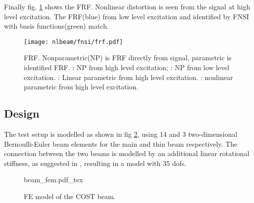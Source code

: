 Finally fig. \ref{fig:nlbeam_frf} shows the FRF. Nonlinear distortion is seen
from the signal at high level excitation. The FRF(blue) from low level excitation and
identified by FNSI with basis functions(green) match.

\begin{figure}[!ht]
  \centering
  \texttt{[image: nlbeam/fnsi/frf.pdf]}
  \caption{FRF. Nonparametric(NP) is FRF directly from signal, parametric is
    identified FRF.
    \sampleline{}: NP from high level excitation;
    \textcolor{blue}{\sampleline{}}: NP from low level excitation.
    \textcolor{orange}{\sampleline{}}: Linear parametric from high level excitation.
    \textcolor{green}{}: nonlinear parametric from high level excitation.
}
  \label{fig:nlbeam_frf}
\end{figure}

\subsection{Design}

The test setup is modelled as shown in fig \ref{fig:nlbeam_fem}, using 14 and 3
two-dimensional Bernoulli-Euler beam elements for the main and thin beam
respectively. The connection between the two beams is modelled by an additional
linear rotational stiffness, as suggested in \autocite{lenaerts2003a}, resulting
in a model with 35 dofs.

\begin{figure}[!ht]
  \centering
  \def\svgwidth{10cm}
  {beam_fem.pdf_tex}
  \caption{FE model of the COST beam.}
  \label{fig:nlbeam_fem}
\end{figure}

